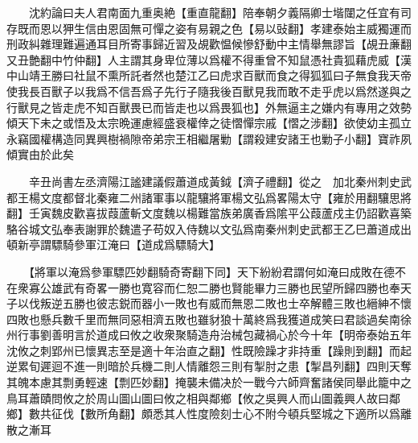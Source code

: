 　　沈約論曰夫人君南面九重奥絶【重直龍翻】陪奉朝夕義隔卿士堦闥之任宜有司存既而恩以狎生信由恩固無可憚之姿有易親之色【易以䜴翻】孝建泰始主威獨運而刑政糾雜理難遍通耳目所寄事歸近習及覘歡愠候慘舒動中主情舉無謬旨【覘丑亷翻又丑艶翻中竹仲翻】人主謂其身卑位薄以爲權不得重曾不知鼠憑社貴狐藉虎威【漢中山靖王勝曰社鼠不熏所託者然也楚江乙曰虎求百獸而食之得狐狐曰子無食我天帝使我長百獸子以我爲不信吾爲子先行子隨我後百獸見我而敢不走乎虎以爲然遂與之行獸見之皆走虎不知百獸畏已而皆走也以爲畏狐也】外無逼主之嫌内有專用之效勢傾天下未之或悟及太宗晩運慮經盛衰權倖之徒慴憚宗戚【慴之涉翻】欲使幼主孤立永竊國權構造同異興樹禍隙帝弟宗王相繼屠勦【謂殺建安諸王也勦子小翻】寶祚夙傾實由於此矣

　　辛丑尚書左丞濟陽江謐建議假蕭道成黃鉞【濟子禮翻】從之　加北秦州刺史武都王楊文度都督北秦雍二州諸軍事以龍驤將軍楊文弘爲畧陽太守【雍於用翻驤思將翻】壬寅魏皮歡喜拔葭蘆斬文度魏以楊難當族弟廣香爲隂平公葭蘆戍主仍詔歡喜築駱谷城文弘奉表謝罪於魏遣子苟奴入侍魏以文弘爲南秦州刺史武都王乙巳蕭道成出頓新亭謂驃騎參軍江淹曰【道成爲驃騎大】

　　【將軍以淹爲參軍驃匹妙翻騎奇寄翻下同】天下紛紛君謂何如淹曰成敗在德不在衆寡公雄武有奇畧一勝也寛容而仁恕二勝也賢能畢力三勝也民望所歸四勝也奉天子以伐叛逆五勝也彼志鋭而器小一敗也有威而無恩二敗也士卒解體三敗也縉紳不懷四敗也懸兵數千里而無同惡相濟五敗也雖豺狼十萬終爲我獲道成笑曰君談過矣南徐州行事劉善明言於道成曰攸之收衆聚騎造舟治械包藏禍心於今十年【明帝泰始五年沈攸之刺郢州已懷異志至是適十年治直之翻】性既險躁才非持重【躁則到翻】而起逆累旬遲迴不進一則暗於兵機二則人情離怨三則有掣肘之患【掣昌列翻】四則天奪其魄本慮其剽勇輕速【剽匹妙翻】掩襲未備决於一戰今六師齊奮諸侯同舉此籠中之鳥耳蕭賾問攸之於周山圖山圖曰攸之相與鄰鄉【攸之吳興人而山圖義興人故曰鄰鄉】數共征伐【數所角翻】頗悉其人性度險刻士心不附今頓兵堅城之下適所以爲離散之漸耳

